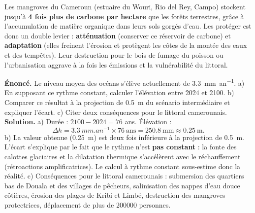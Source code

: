 \documentclass[11pt]{article}
\begin{document}
\begin{savaistu}
Les mangroves du Cameroun (estuaire du Wouri, Rio del Rey, Campo) stockent jusqu'à \textbf{4 fois plus de carbone par hectare} que les forêts terrestres, grâce à l'accumulation de matière organique dans leurs sols gorgés d'eau. Les protéger est donc un double levier : \textbf{atténuation} (conserver ce réservoir de carbone) et \textbf{adaptation} (elles freinent l'érosion et protègent les côtes de la montée des eaux et des tempêtes). Leur destruction pour le bois de fumage du poisson ou l'urbanisation aggrave à la fois les émissions et la vulnérabilité du littoral.
\end{savaistu}

\begin{exoresolu}
\textbf{Énoncé.} Le niveau moyen des océans s'élève actuellement de \SI{3,3}{mm.an^{-1}}. a) En supposant ce rythme constant, calculer l'élévation entre 2024 et 2100. b) Comparer ce résultat à la projection de \SI{0,5}{\meter} du scénario intermédiaire et expliquer l'écart. c) Citer deux conséquences pour le littoral camerounais.
\tcblower
\textbf{Solution.}
a) Durée : $2100 - 2024 = 76$ ans. Élévation :
\[
\Delta h = \SI{3,3}{mm.an^{-1}} \times 76 \ \text{ans} = \SI{250,8}{\milli\meter} \approx \SI{0,25}{\meter}.
\]
b) La valeur obtenue (\SI{0,25}{\meter}) est deux fois inférieure à la projection de \SI{0,5}{\meter}. L'écart s'explique par le fait que le rythme n'est \textbf{pas constant} : la fonte des calottes glaciaires et la dilatation thermique s'accélèrent avec le réchauffement (rétroactions amplificatrices). Le calcul à rythme constant sous-estime donc la réalité.
c) Conséquences pour le littoral camerounais : submersion des quartiers bas de Douala et des villages de pêcheurs, salinisation des nappes d'eau douce côtières, érosion des plages de Kribi et Limbé, destruction des mangroves protectrices, déplacement de plus de \num{200000} personnes.
\end{exoresolu}
\end{document}
